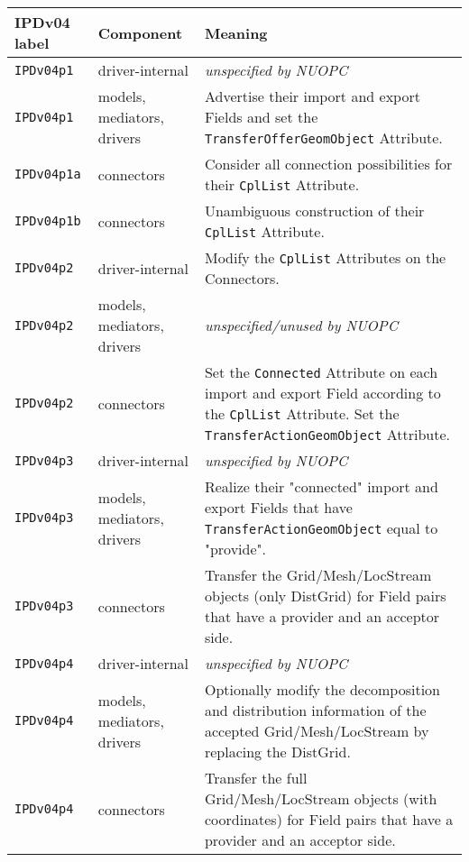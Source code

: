 \vspace*{3ex}
\begin{longtable}[h]{|p{35mm}|p{4cm}|p{6cm}|}
     \hline\hline
     {\bf IPDv04 label} & {\bf Component} & {\bf Meaning}\\
     \hline\hline
     {\tt IPDv04p1}   & driver-internal             & {\em unspecified by NUOPC}\\ \hline
     {\tt IPDv04p1}   & models, mediators, drivers  & Advertise their import and export Fields and set the {\tt TransferOfferGeomObject} Attribute.\\ \hline
     {\tt IPDv04p1a}  & connectors                  & Consider all connection possibilities for their {\tt CplList} Attribute.\\ \hline
     {\tt IPDv04p1b}  & connectors                  & Unambiguous construction of their {\tt CplList} Attribute.\\ \hline
     {\tt IPDv04p2}   & driver-internal             & Modify the {\tt CplList} Attributes on the Connectors.\\ \hline
     {\tt IPDv04p2}   & models, mediators, drivers  & {\em unspecified/unused by NUOPC}\\ \hline
     {\tt IPDv04p2}   & connectors                  & Set the {\tt Connected} Attribute on each import and export Field according to the {\tt CplList} Attribute. Set the {\tt TransferActionGeomObject} Attribute.\\ \hline
     {\tt IPDv04p3}   & driver-internal             & {\em unspecified by NUOPC}\\ \hline
     {\tt IPDv04p3}   & models, mediators, drivers  & Realize their "connected" import and export Fields that have {\tt TransferActionGeomObject} equal to "provide".\\ \hline
     {\tt IPDv04p3}   & connectors                  & Transfer the Grid/Mesh/LocStream objects (only DistGrid) for Field pairs that have a provider and an acceptor side.\\ \hline
     {\tt IPDv04p4}   & driver-internal             & {\em unspecified by NUOPC}\\ \hline
     {\tt IPDv04p4}   & models, mediators, drivers  & Optionally modify the decomposition and distribution information of the accepted Grid/Mesh/LocStream by replacing the DistGrid.\\ \hline
     {\tt IPDv04p4}   & connectors                  & Transfer the full Grid/Mesh/LocStream objects (with coordinates) for Field pairs that have a provider and an acceptor side.\\ \hline

\end{longtable}
